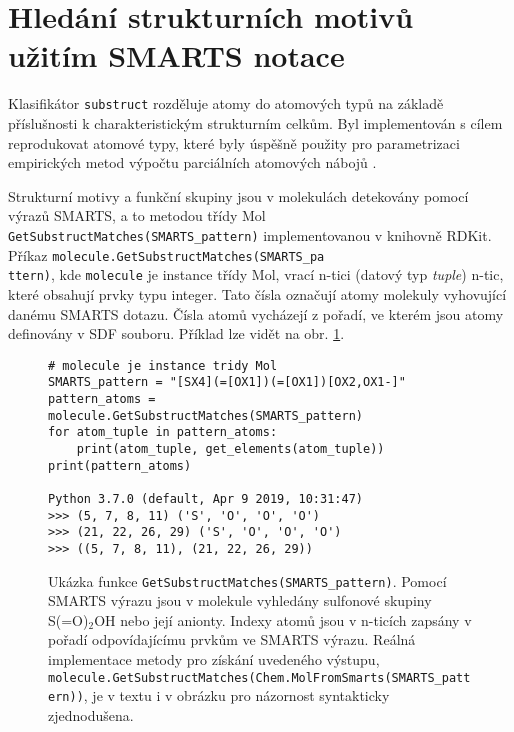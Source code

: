\section{Hledání strukturních motivů užitím SMARTS notace}
\label{substruct}
Klasifikátor \verb|substruct| rozděluje atomy do atomových typů na základě příslušnosti k charakteristickým strukturním celkům. Byl implementován s cílem reprodukovat atomové typy, které byly úspěšně použity pro parametrizaci empirických metod výpočtu parciálních atomových nábojů \cite{attyp1, attyp2}. 

Strukturní motivy a funkční skupiny jsou v molekulách detekovány pomocí výrazů SMARTS, a to metodou třídy Mol \verb|GetSubstructMatches(SMARTS_pattern)| implementovanou v knihovně RDKit. 
Příkaz \verb|molecule.GetSubstructMatches(SMARTS_pa|\\\verb|ttern)|, kde \verb|molecule| je instance třídy Mol, 
vrací n-tici (datový typ \textit{tuple}) n-tic, které  obsahují prvky typu integer. Tato čísla označují atomy molekuly vyhovující danému SMARTS dotazu. Čísla atomů vycházejí z pořadí, ve kterém jsou atomy definovány v SDF souboru. 
Příklad lze vidět na obr. \ref{smarts_tuples}.


\begin{figure}[h]
\label{smarts_tuples}
\begin{lstlisting}
# molecule je instance tridy Mol
SMARTS_pattern = "[SX4](=[OX1])(=[OX1])[OX2,OX1-]"
pattern_atoms = molecule.GetSubstructMatches(SMARTS_pattern)
for atom_tuple in pattern_atoms:
    print(atom_tuple, get_elements(atom_tuple))
print(pattern_atoms)

Python 3.7.0 (default, Apr 9 2019, 10:31:47)
>>> (5, 7, 8, 11) ('S', 'O', 'O', 'O')
>>> (21, 22, 26, 29) ('S', 'O', 'O', 'O')
>>> ((5, 7, 8, 11), (21, 22, 26, 29))
\end{lstlisting}
\cprotect\caption{Ukázka funkce \verb|GetSubstructMatches(SMARTS_pattern)|. Pomo\-cí SMARTS výrazu jsou v molekule vyhledány sulfonové skupiny S(=O)$_2$OH nebo její anionty. Indexy atomů jsou v n-ticích zapsány v pořadí odpovídajícímu prvkům ve SMARTS výrazu. Reálná implementace metody pro získání uvedeného výstupu, \verb|molecule.GetSubstructMatches(Chem.MolFromSmarts(SMARTS_pattern))|, je v textu i v obrázku pro názornost syntakticky zjednodušena.}
\end{figure}

